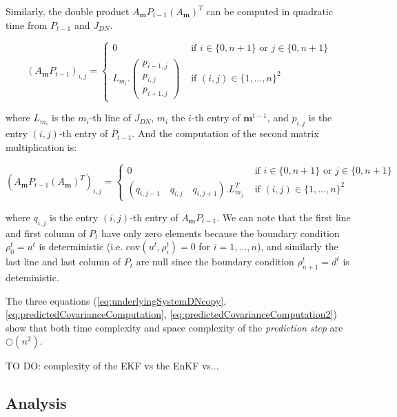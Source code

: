 \documentclass[11pt]{article}
\numberwithin{equation}{section}
\numberwithin{figure}{section}
\numberwithin{table}{section}
\begin{document}
\noindent Similarly, the double product $A_{\boldsymbol m}P_{t-1}(A_{\boldsymbol m})^{T}$ can be computed in quadratic time from $P_{t-1}$ and $J_{DN}$.

\begin{equation}
(A_{\boldsymbol m}P_{t-1})_{i,j} = \begin{cases}
0 & \text{ if } i\in\{0,n+1\}\text{ or }j\in\{0,n+1\}\\
L_{m_{i}}.\left( \begin{array}{c}
p_{i-1,j}\\
p_{i,j}\\
p_{i+1,j}
\end{array} \right) & \text{ if } (i,j)\in\{1,...,n\}^{2}
\end{cases}
\label{eq:predictedCovarianceComputation}
\end{equation}

\noindent where $L_{m_{i}}$ is the $m_{i}$-th line of $J_{DN}$, $m_{i}$ the $i$-th entry of $\boldsymbol m^{t-1}$, and $p_{i,j}$ is the entry $(i,j)$-th entry of $P_{t-1}$. And the computation of the second matrix multiplication is:

\begin{equation}
(A_{\boldsymbol m}P_{t-1}(A_{\boldsymbol m})^{T})_{i,j} = \begin{cases}
0 & \text{ if } i\in\{0,n+1\}\text{ or }j\in\{0,n+1\}\\
(q_{i,j-1}\quad q_{i,j}\quad q_{i,j+1}).L_{m_{j}}^{T} & \text{ if } (i,j)\in\{1,...,n\}^{2}
\end{cases}
\label{eq:predictedCovarianceComputation2}
\end{equation}

\noindent where $q_{i,j}$ is the entry $(i,j)$-th entry of $A_{\boldsymbol m}P_{t-1}$. We can note that the first line and first column of $P_{t}$ have only zero elements because the boundary condition $\rho^{t}_{0}=u^{t}$ is deterministic (i.e. $\text{cov}(u^{t},\rho^{t}_{i})=0$ for $i=1,...,n$), and similarly the last line and last column of $P_{t}$ are null since the boundary condition $\rho^{t}_{n+1}=d^{t}$ is deteministic.

The three equations (\ref{eq:underlyingSystemDNcopy}, \ref{eq:predictedCovarianceComputation}, \ref{eq:predictedCovarianceComputation2}) show that both time complexity and space complexity of the \textit{prediction step} are $\bigcirc(n^{2})$.

TO DO: complexity of the EKF vs the EnKF vs...

\subsection{Analysis}
\end{document}

